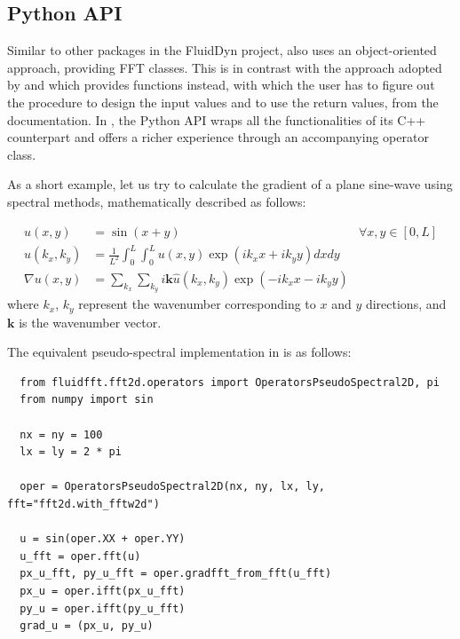 \documentclass{../jors}
\begin{document}
\subsection*{Python API} Similar to other packages in the FluidDyn project,
 also uses an object-oriented approach, providing FFT classes.
%
This is in contrast with the approach adopted by  and  which provides functions instead, with which the user has to
figure out the procedure to design the input values and to use the return
values, from the documentation.
%
In , the Python API wraps all the functionalities of its C++
counterpart and offers a richer experience through an accompanying
operator class.

As a short example, let us try to calculate the gradient of a plane sine-wave
using spectral methods, mathematically described as follows:

\begin{align*}
  u(x,y) &=
    \sin(x + y) &\forall x,y \in \left[0, L \right] \\
  \hat u(k_x,k_y) &=
    \frac{1}{L^2}
    \int_0^{L}\int_0^{L}
    u(x,y) \exp(ik_x x + ik_y y) dx dy \\
  \nabla u(x,y) &=
    \sum_{k_x} \sum_{k_y}
    i\mathbf{k}
    \hat u(k_x,k_y) \exp(-ik_x x - ik_y y)
\end{align*}
%
where $k_x$, $k_y$ represent the wavenumber corresponding to $x$ and $y$ directions,
and $\mathbf{k}$ is the wavenumber vector.

The equivalent pseudo-spectral implementation in  is as follows:
\begin{verbatim}
  from fluidfft.fft2d.operators import OperatorsPseudoSpectral2D, pi
  from numpy import sin

  nx = ny = 100
  lx = ly = 2 * pi

  oper = OperatorsPseudoSpectral2D(nx, ny, lx, ly, fft="fft2d.with_fftw2d")

  u = sin(oper.XX + oper.YY)
  u_fft = oper.fft(u)
  px_u_fft, py_u_fft = oper.gradfft_from_fft(u_fft)
  px_u = oper.ifft(px_u_fft)
  py_u = oper.ifft(py_u_fft)
  grad_u = (px_u, py_u)
\end{verbatim}
\end{document}

